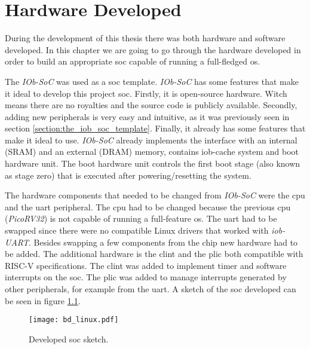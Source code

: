 \chapter{Hardware Developed}
During the development of this thesis there was both hardware and software developed. In this chapter we are going to go through the hardware developed in order to build an appropriate \acrfull{soc} capable of running a full-fledged \acrfull{os}.

The \textit{IOb-SoC} was used as a \acrfull{soc} template. \textit{IOb-SoC} has some features that make it ideal to develop this project \acrshort{soc}. Firstly, it is open-source hardware. Witch means there are no royalties and the source code is publicly available. Secondly, adding new peripherals is very easy and intuitive, as it was previously seen in section \ref*{section:the_iob_soc_template}. Finally, it already has some features that make it ideal to use. \textit{IOb-SoC} already implements the interface with an internal (SRAM) and an external (DRAM) memory, contains iob-cache system and boot hardware unit. The boot hardware unit controls the first boot stage (also known as stage zero) that is executed after powering/resetting the system.

The hardware components that needed to be changed from \textit{IOb-SoC} were the \acrfull{cpu} and the \acrfull{uart} peripheral. The \acrshort{cpu} had to be changed because the previous \acrshort{cpu} (\textit{PicoRV32}) is not capable of running a full-feature \acrlong{os}. The \acrshort{uart} had to be swapped since there were no compatible Linux drivers that worked with \textit{iob-UART}. Besides swapping a few components from the chip new hardware had to be added. The additional hardware is the \acrshort{clint} and the \acrshort{plic} both compatible with RISC-V specifications. The \acrshort{clint} was added to implement timer and software interrupts on the \acrshort{soc}. The \acrshort{plic} was added to manage interrupts generated by other peripherals, for example from the \acrshort{uart}. A sketch of the \acrshort{soc} developed can be seen in figure \ref{fig:bd_linux}.

\begin{figure}[!h]
    \centering
    \texttt{[image: bd\_linux.pdf]}
    \caption{Developed \acrshort{soc} sketch.}
    \label{fig:bd_linux}
\end{figure}

